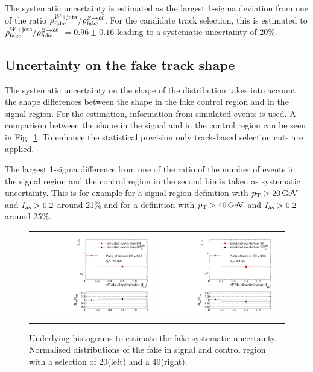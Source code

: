 The systematic uncertainty is estimated as the largest 1-sigma deviation from one of the ratio $\rho_{\text{fake}}^{W+\text{jets}}$/$\rho_{\text{fake}}^{Z\rightarrow\ell\bar{\ell}}$.
For the candidate track selection, this is estimated to $\rho_{\text{fake}}^{W+\text{jets}}/\rho_{\text{fake}}^{Z\rightarrow\ell\bar{\ell}}$ $ =  0.96 \pm 0.16 $ leading to a systematic uncertainty of 20\%.
\subsection{Uncertainty on the fake track \ias shape}
\label{sec:FakeIasUncertainty}
The systematic uncertainty on the shape of the \ias distribution takes into account the shape differences between the \ias shape in the fake control region \fakeCR and in the signal region.
For the estimation, information from simulated \WJets events is used.
A comparison between the \ias shape in the signal and in the control region can be seen in Fig.~\ref{fig:FakeIasUnc}.
To enhance the statistical precision only track-based selection cuts are applied.

The largest 1-sigma difference from one of the ratio of the number of events in the signal region and the control region in the second bin is taken as systematic uncertainty.
This is for example for a signal region definition with $p_{\text{T}}>20\,\text{Ge}\kern-0.06667em\text{V}$ and $I_{\text{as}}>0.2$ around 21\% and for a definition with $p_{\text{T}}>40\,\text{Ge}\kern-0.06667em\text{V}$ and $I_{\text{as}}>0.2$ around 25\%.
\begin{figure}[!h]
  \centering 
  \begin{tabular}{c}
    \includegraphics[width=0.49\textwidth]{figures/analysis/Background/hASmi_SRbinning_fakes_ECalaoLe5_trackPtGt20_MC_CR_MC_SR.pdf}
    \includegraphics[width=0.49\textwidth]{figures/analysis/Background/hASmi_SRbinning_fakes_ECalaoLe5_trackPtGt40_MC_CR_MC_SR.pdf}
  \end{tabular}
  \caption{Underlying histograms to estimate the fake \ias systematic uncertainty. Normalised distributions of the fake \ias in signal and control region with a \pt selection of 20\gev (left) and a 40\gev (right).}
  \label{fig:FakeIasUnc}
\end{figure}

